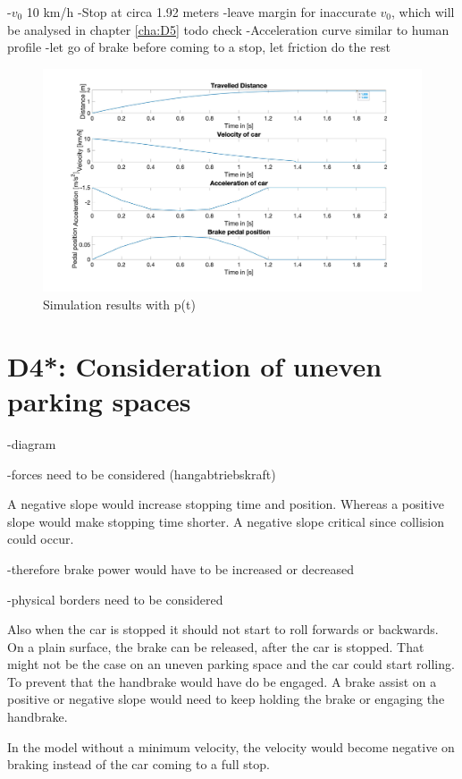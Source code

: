 -$v_0$ 10 km/h
-Stop at circa 1.92 meters
-leave margin for inaccurate $v_0$, which will be analysed in chapter \ref{cha:D5} todo check
-Acceleration curve similar to human profile
-let go of brake before coming to a stop, let friction do the rest
\begin{figure}[H]
\centering
\includegraphics[width=1\textwidth]{images/D3_pt.jpg}
\caption{Simulation results with p(t)}
\label{fig:D3_IndividualBraking2}
\end{figure}

\chapter{D4*: Consideration of uneven parking spaces}\label{cha:D4}

-diagram

-forces need to be considered (hangabtriebskraft)

A negative slope would increase stopping time and position. Whereas a positive slope would make stopping time shorter.
A negative slope critical since collision could occur.


-therefore brake power would have to be increased or decreased

-physical borders need to be considered

Also when the car is stopped it should not start to roll forwards or backwards.
On a plain surface, the brake can be released, after the car is stopped. That might not be the case on an uneven parking space and the car could start rolling. To prevent that the handbrake would have do be engaged.
A brake assist on a positive or negative slope would need to keep holding the brake or engaging the handbrake.

In the model without a minimum velocity, the velocity would become negative on braking instead of the car coming to a full stop.

